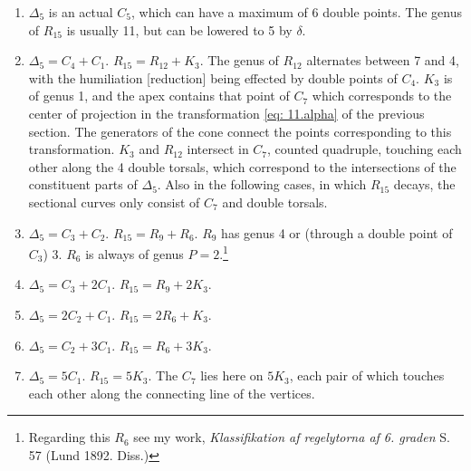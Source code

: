 \documentclass[leqno]{article}
\begin{document}
\begin{enumerate}[label=\arabic*)]
	\item $\Delta_5$ is an actual $C_5$, which can have a maximum of 6 double points. The genus of $R_{15}$ is usually 11, but can be lowered to 5 by $\delta$.
	\item $\Delta_5 = C_4 + C_1$. $R_{15} = R_{12} + K_3$. The genus of $R_{12}$ alternates between 7 and 4, with the humiliation [reduction] being effected by  double points of $C_4$. $K_3$ is of genus 1, and the apex contains that point of $C_7$ which corresponds to the center of projection in the transformation \eqref{eq: 11.alpha} of the previous section. The generators of the cone connect the points corresponding to this transformation. $K_3$ and $R_{12}$ intersect in $C_7$, counted quadruple, touching each other along the 4 double torsals, which correspond to the intersections of the constituent parts of $\Delta_5$. Also in the following cases, in which $R_{15}$ decays, the sectional curves only consist of $C_7$ and double torsals.
	\item $\Delta_5 = C_3 + C_2$. $R_{15} = R_9 + R_6$. $R_9$ has genus 4 or (through a double point of $C_3$) 3. $R_6$ is always of genus $P=2$.\footnote{Regarding this $R_6$ see my work, \textit{Klassifikation af regelytorna af 6. graden} S. 57 (Lund 1892. Diss.)} 
	\item $\Delta_5 = C_3 + 2 C_1$. $R_{15} = R_9 + 2 K_3$. 
	\item $\Delta_5 = 2 C_2 + C_1$. $R_{15} = 2 R_6 + K_3$.
	\item $\Delta_5 = C_2 + 3 C_1$. $R_{15} = R_6 + 3 K_3$.
	\item $\Delta_5 = 5 C_1$. $R_{15} = 5 K_3$. The $C_7$ lies here on $5K_3$, each pair of which touches each other along the connecting line of the vertices.
\end{enumerate}
\end{document}
